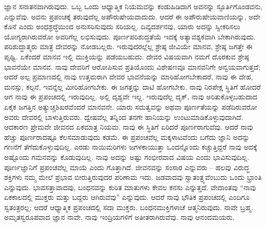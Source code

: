 ಜ್ಞಾನ ಸನಾತನವಾಗಿರುವುದು. ಒಬ್ಬ ಒಂದು ಆಧ್ಯಾತ್ಮಿಕ ನಿಯಮವನ್ನು ಕಂಡುಹಿಡಿದಾಗ ಅವನನ್ನು ಸ್ಫೂರ್ತಿಗೊಂಡವನು, ಎನ್ನುವೆವು. ಅವನು ಪ್ರಪಂಚಕ್ಕೆ ತರುವುದೆಲ್ಲ ಅಪೌರುಷೇಯವಾದುದು. ಆದರೆ ಈ ಅಪೌರುಷೇಯವಾಣಿಯನ್ನು, ಅದೇ ಕೊನೆ ಎಂದು ಅಂಧಶ್ರದ್ಧೆಯಿಂದ ಅನುಸರಿಸುವುದು ಸರಿಯಲ್ಲ. ದಿವ್ಯದರ್ಶನವು, ಯಾರು ಅದನ್ನು ಸ್ವೀಕರಿಸಲು ಯೋಗ್ಯರಾಗಿರುವರೋ ಅವರಿಗೆಲ್ಲ ಲಭಿಸುವುದು. ಪೂರ್ಣಪರಿಶುದ್ಧತೆಯೆ ಇದಕ್ಕೆ ಅತ್ಯಾವಶ್ಯಕವಾಗಿ ಬೇಕಾಗಿರುವುದು. ಪರಿಶುದ್ಧಾತ್ಮರು ಮಾತ್ರ ದೇವರನ್ನು ನೋಡಬಲ್ಲರು. ಇರುವುದರಲ್ಲೆಲ್ಲ ಶ್ರೇಷ್ಠ ಜೀವಿಯೇ ಮಾನವ, ಶ್ರೇಷ್ಠ ಜಗತ್ತೇ ಈ ಪೃಥ್ವಿ. ಏಕೆಂದರೆ ಮಾನವ ಇಲ್ಲಿ ಮುಕ್ತಿಯನ್ನು ಪಡೆಯಬಹುದು. ದೇವರ ವಿಷಯವಾಗಿ ನಮಗೆ ದೊರಕುವ ಶ್ರೇಷ್ಠ ಭಾವನೆಯೇ ಮಾನವ. ನಾವು ದೇವರಿಗೆ ಆರೋಪಿಸುವ ಪ್ರತಿಯೊಂದು ವಿಶೇಷಣವೂ ಮಾನವನಿಗೇ ಅನ್ವಯವಾಗುತ್ತದೆ; ಆದರೆ ಅಲ್ಪ ಪ್ರಮಾಣದಲ್ಲಿ ನಾವು ಉತ್ತಮರಾಗಿ ದೇವರ ಭಾವನೆಯನ್ನು ಮಾರಿಹೋಗಬೇಕಾದರೆ, ನಾವು ಈ ದೇಹ, ಮನಸ್ಸು, ಕಲ್ಪನೆ, ಇವನ್ನೆಲ್ಲ ಮೀರಿಹೋಗಬೇಕು. ಈ ಜಗತ್ತನ್ನು ದಾಟಿ ಹೋಗಬೇಕು. ನಾವು ನಿರಪೇಕ್ಷ ಸ್ಥಿತಿಗೆ ಹೋದರೆ ಆಗ ನಾವು ಈ ಪ್ರಪಂಚದಲ್ಲಿ ಇರುವುದಿಲ್ಲ. ಅಲ್ಲಿ ದೃಶ್ಯವೇ ಇಲ್ಲ. ಇರುವುದೆಲ್ಲ ದೃಕ್, ನಾವು ಅರಿತುಕೊಳ್ಳಬಹುದಾದ ಏಕೈಕ ಜಗತ್ತಿನ ಅತ್ಯುಚ್ಚ\break ಶಿಖರವೆಂದರೆ ಮಾನವನೇ. ಯಾರು ಸಮತ್ವವನ್ನು ಅಥವಾ ಪೂರ್ಣತೆಯನ್ನು ಪಡೆದಿರುವರೋ ಅವರು ದೇವರಲ್ಲಿ ಬಾಳುತ್ತಿರುವರು. ದ್ವೇಷವೆಲ್ಲ ತನ್ನಿಂದ ತನಗೇ ಹಾನಿಯನ್ನು ಉಂಟುಮಾಡಿಕೊಳ್ಳುವುದಾಗಿದೆ. ಆದಕಾರಣ ಪ್ರೇಮವೇ ಜೀವನದ ಏಕಮಾತ್ರ ನಿಯಮ. ನಾವು ಈ ಸ್ಥಿತಿಗೆ ಏರಿದರೆ ಪೂರ್ಣರಾಗುವೆವು. ಆದರೆ ನಾವು ಹೆಚ್ಚು ಪೂರ್ಣರಾದಷ್ಟೂ ಕೆಲಸಮಾಡುವುದು ಕಡಮೆ. ಈ ಪ್ರಪಂಚವೆಲ್ಲ ಮಕ್ಕಳಾಟವೆಂದು ಬಗೆದು ಜ್ಞಾನಿ ಅದನ್ನು ಗಣನೆಗೆ ತೆಗೆದುಕೊಳ್ಳುವುದಿಲ್ಲ. ಎರಡು ನಾಯಿಮರಿಗಳು ಜಗಳಕಾಯುತ್ತಾ ಒಂದನ್ನೊಂದು ಕಚ್ಚುತ್ತಿದ್ದರೆ ನಾವು ಅದಕ್ಕೆ ಅಷ್ಟೊಂದು ಗಮನವನ್ನು ಕೊಡುವುದಿಲ್ಲ. ನಾವು ಅದನ್ನು ಅಷ್ಟು ಗಂಭೀರವಾದ ವಿಷಯ ಎಂದು ಭಾವಿಸುವುದಿಲ್ಲ. ಪೂರ್ಣಜ್ಞಾನಿಗೆ ಪ್ರಪಂಚವೆಲ್ಲ ಮಾಯೆ ಎಂದು ಗೊತ್ತಾಗಿದೆ. ಜೀವನವನ್ನು ಸಂಸಾರ ಎನ್ನುವರು – ಹಲವು ವಿರುದ್ಧ ಶಕ್ತಿಗಳು ನಮ್ಮ ಮೇಲೆ ಪ್ರಭಾವ ಬೀರುತ್ತಿರುವುದರ ಪರಿಣಾಮ ಇದು. ಜಡವಾದವು ಸ್ವಾತಂತ್ರ್ಯವೆಂಬುದು ಒಂದು ಭ್ರಾಂತಿ ಎನ್ನುವುದು. ಭಾವಸತ್ತಾವಾದವು, ಬಂಧನವನ್ನು ಕುರಿತ ಮಾತುಗಳು ಕೇವಲ ಕನಸು ಎನ್ನುತ್ತದೆ. ವೇದಾಂತವು “ನಾವು ಏಕಕಾಲದಲ್ಲಿ ಮುಕ್ತರು ಮತ್ತು ಬದ್ದರು ಆಗಿರುವೆವು'' ಎನ್ನುವುದು. ಆದರೆ ನಾವು ಭೌತಿಕ ಪ್ರಪಂಚದಲ್ಲಿ ಎಂದಿಗೂ ಸ್ವತಂತ್ರರಲ್ಲ; ಆದರೆ ಆಧ್ಯಾತ್ಮಿಕ ಪ್ರಪಂಚದಲ್ಲಿ ಸದಾ ಮುಕ್ತರು. ಬಂಧನಮುಕ್ತಿಗಳಾಚೆ ಆತ್ಮನಿರುವುದು. ನಾವೇ ಬ್ರಹ್ಮ. ಅಮೃತಸ್ವರೂಪವಾದ ಜ್ಞಾನ ನಾವೇ. ನಾವು ಇಂದ್ರಿಯಗಳಿಗೆ ಅತೀತರಾಗಿರುವೆವು. ನಾವು ಆನಂದಮಯರು.

